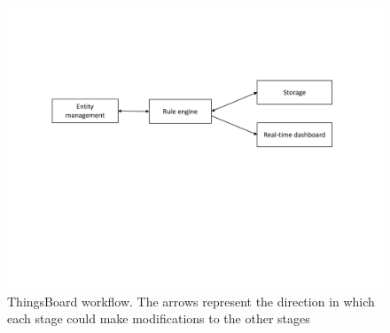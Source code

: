 \begin{figure}[hbt!]
  \centering
  \includegraphics[scale=0.6]{figures/thingsboard_workflow.pdf}
  \caption[ThingsBoard workflow]{ThingsBoard workflow. The arrows represent the direction in which each stage could make modifications to the other stages}
  \label{fig:thingsboard_workflow}
\end{figure}


